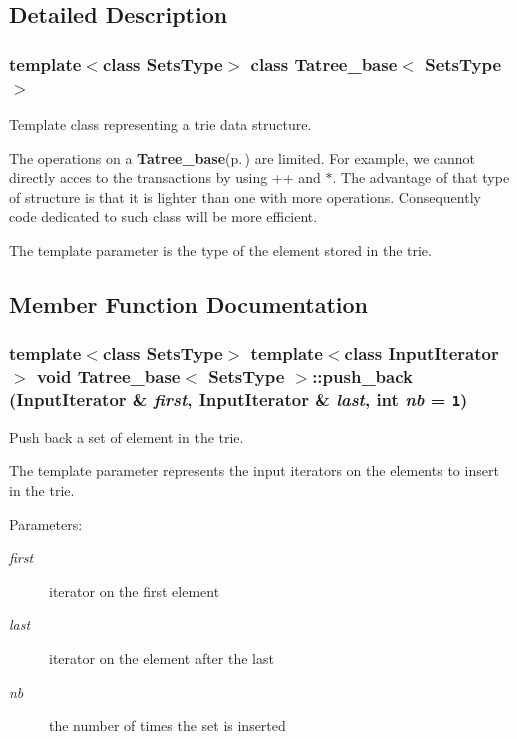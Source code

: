 \subsection{Detailed Description}
\subsubsection*{template$<$class Sets\-Type$>$ class Tatree\_\-base$<$ Sets\-Type $>$}

Template class representing a trie data structure. 

The operations on a {\bf Tatree\_\-base}{\rm (p.\,\pageref{class_tatree__base})} are limited. For example, we cannot directly acces to the transactions by using ++ and $\ast$. The advantage of that type of structure is that it is lighter than one with more operations. Consequently code dedicated to such class will be more efficient.

The template parameter is the type of the element stored in the trie. 



\subsection{Member Function Documentation}
\subsubsection{\setlength{\rightskip}{0pt plus 5cm}template$<$class Sets\-Type$>$ template$<$class Input\-Iterator$>$ void {\bf Tatree\_\-base}$<$ Sets\-Type $>$::push\_\-back (Input\-Iterator \& {\em first}, Input\-Iterator \& {\em last}, int {\em nb} = {\tt 1})\hspace{0.3cm}{\tt  [inline]}}\label{class_tatree__base_6d855d39b3bdf83c4c759190d763e20a}


Push back a set of element in the trie. 

The template parameter represents the input iterators on the elements to insert in the trie. \begin{Desc}
\item[Parameters:]
\begin{description}
\item[{\em first}]iterator on the first element \item[{\em last}]iterator on the element after the last \item[{\em nb}]the number of times the set is inserted \end{description}
\end{Desc}
